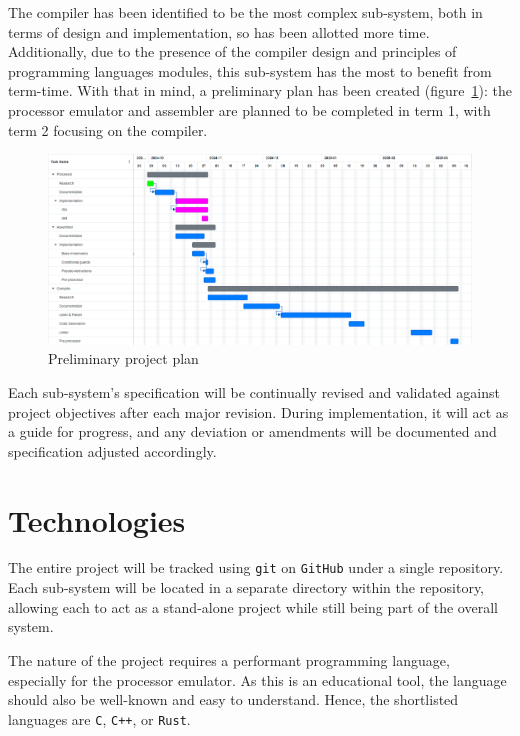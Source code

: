 \documentclass{article}
\begin{document}
    The compiler has been identified to be the most complex sub-system, both in terms of design and implementation, so has been allotted more time.
    Additionally, due to the presence of the compiler design and principles of programming languages modules, this sub-system has the most to benefit from term-time.
    With that in mind, a preliminary plan has been created (figure~\ref{fig:gantt-chart}): the processor emulator and assembler are planned to be completed in term 1, with term 2 focusing on the compiler.

    \begin{figure}
        \centering
        \includegraphics[width=\textwidth]{assets/project-gantt-chart}
        \caption{Preliminary project plan}
        \label{fig:gantt-chart}
    \end{figure}

    Each sub-system's specification will be continually revised and validated against project objectives after each major revision.
    During implementation, it will act as a guide for progress, and any deviation or amendments will be documented and specification adjusted accordingly.

    \section{Technologies}\label{sec:technologies}

    The entire project will be tracked using \texttt{git} on \texttt{GitHub} under a single repository.
    Each sub-system will be located in a separate directory within the repository, allowing each to act as a stand-alone project while still being part of the overall system.

    The nature of the project requires a performant programming language, especially for the processor emulator.
    As this is an educational tool, the language should also be well-known and easy to understand.
    Hence, the shortlisted languages are \texttt{C}, \texttt{C++}, or \texttt{Rust}.
\end{document}
